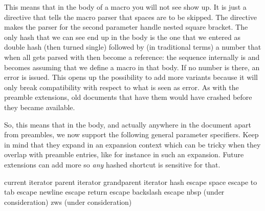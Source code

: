 This means that in the body of a macro you will not see \type {#*} show up. It is
just a directive that tells the macro parser that spaces are to be skipped. The
 directive makes the parser for the second parameter handle nested
square bracket. The only hash that we can see end up in the body is the one that
we entered as double hash (then turned single) followed by (in traditional terms)
a number that when all gets parsed with then become a reference: the sequence
 internally is  and becomes  assuming that we define a macro in that body. If no number is there, an error
is issued. This opens up the possibility to add more variants because it will
only break compatibility with respect to what is seen as error. As with the
preamble extensions, old documents that have them would have crashed before they
became available.

So, this means that in the body, and actually anywhere in the document apart from
preambles, we now support the following general parameter specifiers. Keep in
mind that they expand in an expansion context which can be tricky when they
overlap with preamble entries, like for instance  in such an expansion.
Future extensions can add more so {\em any} hashed shortcut is sensitive for
that.

\starttabulate[|l|||]
\NC {} \NC current iterator     \NC \type {\currentloopiterator}    \NC \NR
\NC {} \NC parent iterator      \NC {} \NC \NR
\NC {} \NC grandparent iterator \NC {} \NC \NR
\TB
\NC {} \NC hash escape          \NC \type {#}  \NC \NR
\NC {} \NC space escape         \NC {} to   \NC \NR
\NC {} \NC tab escape           \NC \type {\t} \NC \NR
\NC {} \NC newline escape       \NC \type {\n} \NC \NR
\NC {} \NC return escape        \NC \type {\r} \NC \NR
\NC {} \NC backslash escape     \NC \tex  {}   \NC \NR
\TB
\NC {} \NC nbsp \NC {} (under consideration) \NC \NR
\NC {} \NC zws  \NC {} (under consideration) \NC \NR
\stoptabulate

